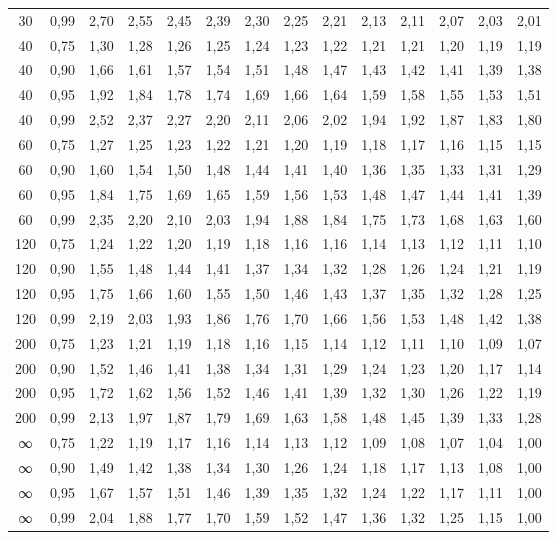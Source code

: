 \documentclass[
]{article}
\begin{document}
\begin{landscape}
\begin{longtable}[t]{cccccccccccccc}
30 & 0,99 & 2,70 & 2,55 & 2,45 & 2,39 & 2,30 & 2,25 & 2,21 & 2,13 & 2,11 & 2,07 & 2,03 & 2,01\\
40 & 0,75 & 1,30 & 1,28 & 1,26 & 1,25 & 1,24 & 1,23 & 1,22 & 1,21 & 1,21 & 1,20 & 1,19 & 1,19\\
40 & 0,90 & 1,66 & 1,61 & 1,57 & 1,54 & 1,51 & 1,48 & 1,47 & 1,43 & 1,42 & 1,41 & 1,39 & 1,38\\
40 & 0,95 & 1,92 & 1,84 & 1,78 & 1,74 & 1,69 & 1,66 & 1,64 & 1,59 & 1,58 & 1,55 & 1,53 & 1,51\\
40 & 0,99 & 2,52 & 2,37 & 2,27 & 2,20 & 2,11 & 2,06 & 2,02 & 1,94 & 1,92 & 1,87 & 1,83 & 1,80\\
60 & 0,75 & 1,27 & 1,25 & 1,23 & 1,22 & 1,21 & 1,20 & 1,19 & 1,18 & 1,17 & 1,16 & 1,15 & 1,15\\
60 & 0,90 & 1,60 & 1,54 & 1,50 & 1,48 & 1,44 & 1,41 & 1,40 & 1,36 & 1,35 & 1,33 & 1,31 & 1,29\\
60 & 0,95 & 1,84 & 1,75 & 1,69 & 1,65 & 1,59 & 1,56 & 1,53 & 1,48 & 1,47 & 1,44 & 1,41 & 1,39\\
60 & 0,99 & 2,35 & 2,20 & 2,10 & 2,03 & 1,94 & 1,88 & 1,84 & 1,75 & 1,73 & 1,68 & 1,63 & 1,60\\
120 & 0,75 & 1,24 & 1,22 & 1,20 & 1,19 & 1,18 & 1,16 & 1,16 & 1,14 & 1,13 & 1,12 & 1,11 & 1,10\\
120 & 0,90 & 1,55 & 1,48 & 1,44 & 1,41 & 1,37 & 1,34 & 1,32 & 1,28 & 1,26 & 1,24 & 1,21 & 1,19\\
120 & 0,95 & 1,75 & 1,66 & 1,60 & 1,55 & 1,50 & 1,46 & 1,43 & 1,37 & 1,35 & 1,32 & 1,28 & 1,25\\
120 & 0,99 & 2,19 & 2,03 & 1,93 & 1,86 & 1,76 & 1,70 & 1,66 & 1,56 & 1,53 & 1,48 & 1,42 & 1,38\\
200 & 0,75 & 1,23 & 1,21 & 1,19 & 1,18 & 1,16 & 1,15 & 1,14 & 1,12 & 1,11 & 1,10 & 1,09 & 1,07\\
200 & 0,90 & 1,52 & 1,46 & 1,41 & 1,38 & 1,34 & 1,31 & 1,29 & 1,24 & 1,23 & 1,20 & 1,17 & 1,14\\
200 & 0,95 & 1,72 & 1,62 & 1,56 & 1,52 & 1,46 & 1,41 & 1,39 & 1,32 & 1,30 & 1,26 & 1,22 & 1,19\\
200 & 0,99 & 2,13 & 1,97 & 1,87 & 1,79 & 1,69 & 1,63 & 1,58 & 1,48 & 1,45 & 1,39 & 1,33 & 1,28\\
∞ & 0,75 & 1,22 & 1,19 & 1,17 & 1,16 & 1,14 & 1,13 & 1,12 & 1,09 & 1,08 & 1,07 & 1,04 & 1,00\\
∞ & 0,90 & 1,49 & 1,42 & 1,38 & 1,34 & 1,30 & 1,26 & 1,24 & 1,18 & 1,17 & 1,13 & 1,08 & 1,00\\
∞ & 0,95 & 1,67 & 1,57 & 1,51 & 1,46 & 1,39 & 1,35 & 1,32 & 1,24 & 1,22 & 1,17 & 1,11 & 1,00\\
∞ & 0,99 & 2,04 & 1,88 & 1,77 & 1,70 & 1,59 & 1,52 & 1,47 & 1,36 & 1,32 & 1,25 & 1,15 & 1,00\\*
\end{longtable}
\endgroup{}
\end{landscape}
\end{document}
